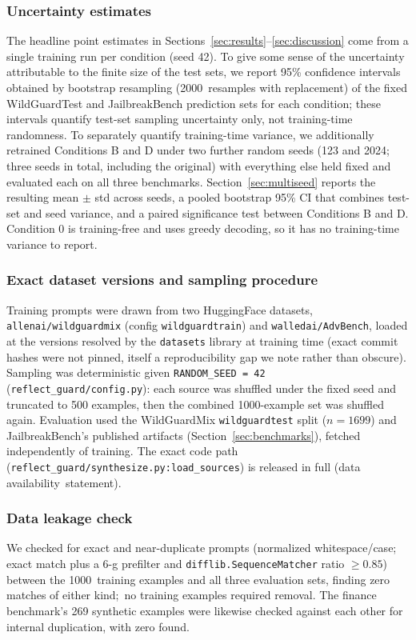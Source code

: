 \documentclass[superintelligence,article,accept,moreauthors]{Definitions/mdpi}
\begin{document}
\subsubsection{Uncertainty estimates
} The headline point estimates in Sections~\ref{sec:results}--\ref{sec:discussion} come from a single training run per condition (seed 42). To give some sense of the uncertainty attributable to the finite size of the test sets, we report 95\% confidence intervals obtained by bootstrap resampling (2000~resamples with replacement) of the fixed WildGuardTest and JailbreakBench prediction sets for each condition; these intervals quantify test-set sampling uncertainty only, not training-time randomness. To separately quantify training-time variance, we additionally retrained Conditions B and D under two further random seeds (123 and 2024; three seeds in total, including the original) with everything else held fixed and evaluated each on all three benchmarks. Section~\ref{sec:multiseed} reports the resulting mean $\pm$ std across seeds, a pooled bootstrap 95\% CI that combines test-set and seed variance, and a paired significance test between Conditions B and D. Condition 0 is training-free and uses greedy decoding, so it has no training-time variance to report.

\subsubsection{Exact dataset versions and sampling procedure} Training prompts were drawn from two HuggingFace datasets, \texttt{allenai/wildguardmix} (config \texttt{wildguardtrain}) and \texttt{walledai/AdvBench}, loaded at the versions resolved by the \texttt{datasets} library at training time (exact commit hashes were not pinned, itself a reproducibility gap we note rather than obscure). Sampling was deterministic given \texttt{RANDOM\_SEED = 42} (\texttt{reflect\_guard/config.py}): each source was shuffled under the fixed seed and truncated to 500 examples, then the combined 1000-example set was shuffled again. Evaluation used the WildGuardMix \texttt{wildguardtest} split ($n=1699$) and JailbreakBench's published artifacts (Section~\ref{sec:benchmarks}), fetched independently of training. The exact code path (\texttt{reflect\_guard/synthesize.py:load\_sources}) is released in full (data \mbox{availability statement}).

\subsubsection{Data leakage check} We checked for exact and near-duplicate prompts (normalized whitespace/case; exact match plus a 6-g prefilter and \texttt{difflib.SequenceMatcher} ratio $\geq 0.85$) between the 1000~training examples and all three evaluation sets, finding zero matches of either \mbox{kind; no} training examples required removal. The finance benchmark's 269 synthetic examples were likewise checked against each other for internal duplication, with zero found.
\end{document}
